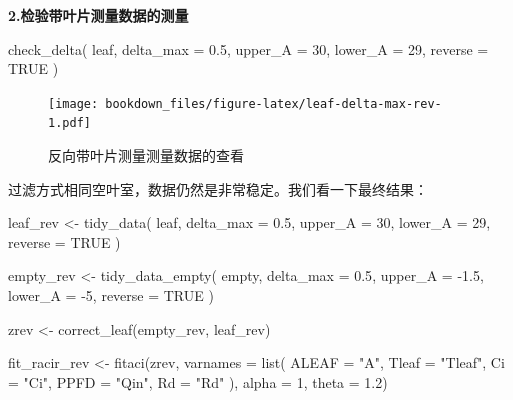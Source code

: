 \documentclass[
]{krantz}
\makeatletter
\newenvironment{Shaded}{\begin{snugshade}}{\end{snugshade}}
\newcommand{\AttributeTok}[1]{\textcolor[rgb]{0.77,0.63,0.00}{#1}}
\newcommand{\ConstantTok}[1]{\textcolor[rgb]{0.00,0.00,0.00}{#1}}
\newcommand{\DecValTok}[1]{\textcolor[rgb]{0.00,0.00,0.81}{#1}}
\newcommand{\FloatTok}[1]{\textcolor[rgb]{0.00,0.00,0.81}{#1}}
\newcommand{\FunctionTok}[1]{\textcolor[rgb]{0.00,0.00,0.00}{#1}}
\newcommand{\NormalTok}[1]{#1}
\newcommand{\OtherTok}[1]{\textcolor[rgb]{0.56,0.35,0.01}{#1}}
\newcommand{\SpecialCharTok}[1]{\textcolor[rgb]{0.00,0.00,0.00}{#1}}
\newcommand{\StringTok}[1]{\textcolor[rgb]{0.31,0.60,0.02}{#1}}
\newenvironment{kframe}{%
\medskip{}
\setlength{\fboxsep}{.8em}
 \def\at@end@of@kframe{}%
 \ifinner\ifhmode%
  \def\at@end@of@kframe{\end{minipage}}%
  \begin{minipage}{\columnwidth}%
 \fi\fi%
 \def\FrameCommand##1{\hskip\@totalleftmargin \hskip-\fboxsep
 \colorbox{shadecolor}{##1}\hskip-\fboxsep
     \hskip-\linewidth \hskip-\@totalleftmargin \hskip\columnwidth}%
 \MakeFramed {\advance\hsize-\width
   \@totalleftmargin\z@ \linewidth\hsize
   \@setminipage}}%
 {\par\unskip\endMakeFramed%
 \at@end@of@kframe}
\renewenvironment{Shaded}{\begin{kframe}}{\end{kframe}}
\makeatother
\begin{document}
\textbf{2.检验带叶片测量数据的测量}

\begin{Shaded}
\begin{Highlighting}[]
\FunctionTok{check\_delta}\NormalTok{(}
\NormalTok{  leaf,}
  \AttributeTok{delta\_max =} \FloatTok{0.5}\NormalTok{,}
  \AttributeTok{upper\_A =} \DecValTok{30}\NormalTok{,}
  \AttributeTok{lower\_A =} \DecValTok{29}\NormalTok{,}
  \AttributeTok{reverse =} \ConstantTok{TRUE}
\NormalTok{)}
\end{Highlighting}
\end{Shaded}

\begin{figure}
\centering
\texttt{[image: bookdown\_files/figure-latex/leaf-delta-max-rev-1.pdf]}
\caption{\label{fig:leaf-delta-max-rev}反向带叶片测量测量数据的查看}
\end{figure}

过滤方式相同空叶室，数据仍然是非常稳定。我们看一下最终结果：

\begin{Shaded}
\begin{Highlighting}[]
\NormalTok{leaf\_rev }\OtherTok{\textless{}{-}} \FunctionTok{tidy\_data}\NormalTok{(}
\NormalTok{  leaf,}
  \AttributeTok{delta\_max =} \FloatTok{0.5}\NormalTok{,}
  \AttributeTok{upper\_A =} \DecValTok{30}\NormalTok{,}
  \AttributeTok{lower\_A =} \DecValTok{29}\NormalTok{,}
  \AttributeTok{reverse =} \ConstantTok{TRUE}
\NormalTok{)}

\NormalTok{empty\_rev }\OtherTok{\textless{}{-}} \FunctionTok{tidy\_data\_empty}\NormalTok{(}
\NormalTok{  empty,}
  \AttributeTok{delta\_max =} \FloatTok{0.5}\NormalTok{,}
  \AttributeTok{upper\_A =} \SpecialCharTok{{-}}\FloatTok{1.5}\NormalTok{,}
  \AttributeTok{lower\_A =} \SpecialCharTok{{-}}\DecValTok{5}\NormalTok{,}
  \AttributeTok{reverse =} \ConstantTok{TRUE}
\NormalTok{)}

\NormalTok{zrev }\OtherTok{\textless{}{-}} \FunctionTok{correct\_leaf}\NormalTok{(empty\_rev, leaf\_rev)}

\NormalTok{fit\_racir\_rev }\OtherTok{\textless{}{-}} \FunctionTok{fitaci}\NormalTok{(zrev,}
               \AttributeTok{varnames =}
                 \FunctionTok{list}\NormalTok{(}
                   \AttributeTok{ALEAF =} \StringTok{"A"}\NormalTok{,}
                   \AttributeTok{Tleaf =} \StringTok{"Tleaf"}\NormalTok{,}
                   \AttributeTok{Ci =} \StringTok{"Ci"}\NormalTok{,}
                   \AttributeTok{PPFD  =} \StringTok{"Qin"}\NormalTok{,}
                   \AttributeTok{Rd =} \StringTok{"Rd"}
\NormalTok{                ), }\AttributeTok{alpha =} \DecValTok{1}\NormalTok{,}
               \AttributeTok{theta =} \FloatTok{1.2}\NormalTok{)}
\end{Highlighting}
\end{Shaded}
\end{document}
